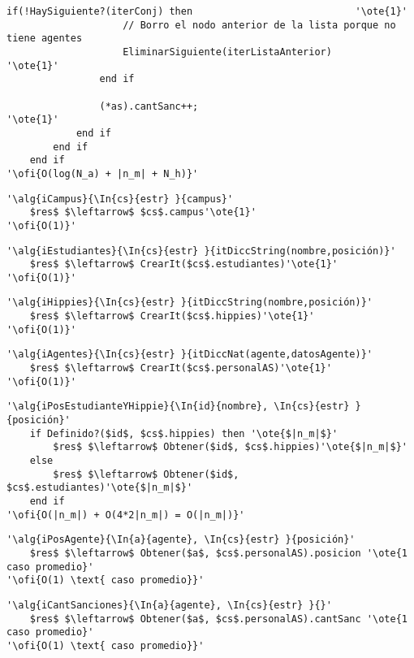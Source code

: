 \begin{lstlisting}[mathescape]
	   			if(!HaySiguiente?(iterConj) then							'\ote{1}'
	   				// Borro el nodo anterior de la lista porque no tiene agentes
	   				EliminarSiguiente(iterListaAnterior)					'\ote{1}'
	   			end if

	   			(*as).cantSanc++;											'\ote{1}'
	   		end if
	   	end if
	end if
'\ofi{O(log(N_a) + |n_m| + N_h)}'
\end{lstlisting}

\begin{lstlisting}[mathescape]
'\alg{iCampus}{\In{cs}{estr} }{campus}'
	$res$ $\leftarrow$ $cs$.campus'\ote{1}'
'\ofi{O(1)}'
\end{lstlisting}

\begin{lstlisting}[mathescape]
'\alg{iEstudiantes}{\In{cs}{estr} }{itDiccString(nombre,posición)}'
	$res$ $\leftarrow$ CrearIt($cs$.estudiantes)'\ote{1}'
'\ofi{O(1)}'
\end{lstlisting}

\begin{lstlisting}[mathescape]
'\alg{iHippies}{\In{cs}{estr} }{itDiccString(nombre,posición)}'
	$res$ $\leftarrow$ CrearIt($cs$.hippies)'\ote{1}'
'\ofi{O(1)}'
\end{lstlisting}

\begin{lstlisting}[mathescape]
'\alg{iAgentes}{\In{cs}{estr} }{itDiccNat(agente,datosAgente)}'
	$res$ $\leftarrow$ CrearIt($cs$.personalAS)'\ote{1}'
'\ofi{O(1)}'
\end{lstlisting}

\begin{lstlisting}[mathescape]
'\alg{iPosEstudianteYHippie}{\In{id}{nombre}, \In{cs}{estr} }{posición}'
	if Definido?($id$, $cs$.hippies) then '\ote{$|n_m|$}'
		$res$ $\leftarrow$ Obtener($id$, $cs$.hippies)'\ote{$|n_m|$}'
	else
		$res$ $\leftarrow$ Obtener($id$, $cs$.estudiantes)'\ote{$|n_m|$}'
	end if
'\ofi{O(|n_m|) + O(4*2|n_m|) = O(|n_m|)}'
\end{lstlisting}

\begin{lstlisting}[mathescape]
'\alg{iPosAgente}{\In{a}{agente}, \In{cs}{estr} }{posición}'
	$res$ $\leftarrow$ Obtener($a$, $cs$.personalAS).posicion '\ote{1 caso promedio}'
'\ofi{O(1) \text{ caso promedio}}'
\end{lstlisting}

\begin{lstlisting}[mathescape]
'\alg{iCantSanciones}{\In{a}{agente}, \In{cs}{estr} }{}'
	$res$ $\leftarrow$ Obtener($a$, $cs$.personalAS).cantSanc '\ote{1 caso promedio}'
'\ofi{O(1) \text{ caso promedio}}'
\end{lstlisting}

